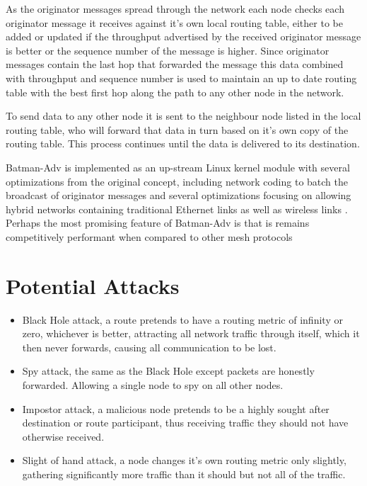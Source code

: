 \documentclass[11pt]{article}
\begin{document}
    As the originator messages spread through the network each node checks each originator message it receives against it's own local routing table, either to be added or updated if the throughput advertised by the received originator message is better or the sequence number of the message is higher. Since originator messages contain the last hop that forwarded the message this data combined with throughput and sequence number is used to maintain an up to date routing table with the best first hop along the path to any other node in the network.
    
    To send data to any other node it is sent to the neighbour node listed in the local routing table, who will forward that data in turn based on it's own copy of the routing table. This process continues until the data is delivered to its destination.
    
    Batman-Adv is implemented as an up-stream Linux kernel module with several optimizations from the original concept, including network coding to batch the broadcast of originator messages and several optimizations focusing on allowing hybrid networks containing traditional Ethernet links as well as wireless links \cite{catwoman}. Perhaps the most promising feature of Batman-Adv is that is remains competitively performant when compared to other mesh protocols \cite{meshperf}

\section{Potential Attacks}

	\begin{itemize}
		\item Black Hole attack, a route pretends to have a routing metric of infinity or zero, whichever is better, attracting all network traffic through itself, which it then never forwards, causing all communication to be lost. 
		\item Spy attack, the same as the Black Hole except packets are honestly forwarded. Allowing a single node to spy on all other nodes. 
		\item Impostor attack, a malicious node pretends to be a highly sought after destination or route participant, thus receiving traffic they should not have otherwise received.
		\item Slight of hand attack, a node changes it's own routing metric only slightly, gathering significantly more traffic than it should but not all of the traffic. 
	\end{itemize}
\end{document}
